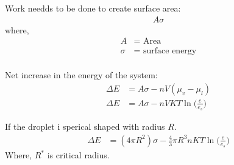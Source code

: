 \documentclass[fleqn,10pt]{SelfArx} %
\begin{document}
Work needds to be done to create surface area:
\begin{align}
    A \sigma
\end{align}
where,
\begin{align*}
    A &= \text{ Area} \\
    \sigma &= \text{ surface energy} \\
\end{align*}

Net increase in the energy of the system: 
\begin{align}
    \Delta E &= A\sigma - nV(\mu_v -\mu_l) \\
    \Delta E &= A\sigma - nVKT \ln{\Big(\frac{e}{e_s}\Big)}
\end{align}

If the droplet i sperical shaped with radius $R$.
\begin{align}
    \Delta E &= (4\pi R^2)\sigma - \frac{4}{3}\pi R^3nKT \ln{\Big(\frac{e}{e_s}\Big)}
\end{align}
Where, $R^*$ is critical radius.
\end{document}
